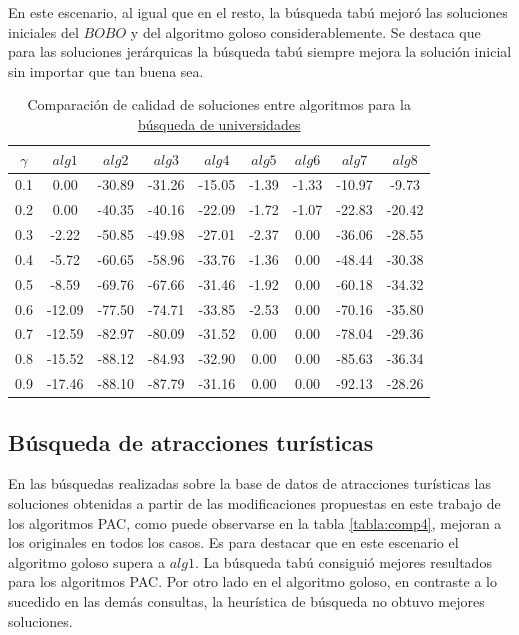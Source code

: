 En este escenario, al igual que en el resto, la búsqueda tabú mejoró las soluciones iniciales del $BOBO$ y del algoritmo goloso considerablemente. Se destaca que para las soluciones jerárquicas la búsqueda tabú siempre mejora la solución inicial sin importar que tan buena sea.
\begin{table}[H]
\begin{center}
\begin{tabular}{|c|c|c|c|c|c|c|c|c|}
\hline
$\gamma$&$alg1$&$alg2$&$alg3$&$alg4$&$alg5$&$alg6$&$alg7$&$alg8$ \\ \hline
0.1 & 0.00 & -30.89 & -31.26 & -15.05 & -1.39 & -1.33 & -10.97 & -9.73 \\
0.2 & 0.00 & -40.35 & -40.16 & -22.09 & -1.72 & -1.07 & -22.83 & -20.42 \\
0.3 & -2.22 & -50.85 & -49.98 & -27.01 & -2.37 & 0.00 & -36.06 & -28.55 \\
0.4 & -5.72 & -60.65 & -58.96 & -33.76 & -1.36 & 0.00 & -48.44 & -30.38 \\
0.5 & -8.59 & -69.76 & -67.66 & -31.46 & -1.92 & 0.00 & -60.18 & -34.32 \\
0.6 & -12.09 & -77.50 & -74.71 & -33.85 & -2.53 & 0.00 & -70.16 & -35.80 \\
0.7 & -12.59 & -82.97 & -80.09 & -31.52 & 0.00 & 0.00 & -78.04 & -29.36 \\
0.8 & -15.52 & -88.12 & -84.93 & -32.90 & 0.00 & 0.00 & -85.63 & -36.34 \\
0.9 & -17.46 & -88.10 & -87.79 & -31.16 & 0.00 & 0.00 & -92.13 & -28.26 \\
 \hline 
\end{tabular}
\caption{Comparación de calidad de soluciones entre algoritmos para la \hyperref[busqueda:universidades]{búsqueda de universidades}} 
\label{tabla:comp3}
\end{center}
\end{table}

\subsection{Búsqueda de atracciones turísticas}\label{res:busAtracciones}
En las búsquedas realizadas sobre la base de datos de atracciones turísticas las soluciones obtenidas a partir de las modificaciones propuestas en este trabajo de los algoritmos PAC, como puede observarse en la tabla \ref{tabla:comp4}, mejoran a los originales en todos los casos. Es para destacar que en este escenario el algoritmo goloso supera a $alg1$. La búsqueda tabú consiguió mejores resultados para los algoritmos PAC. Por otro lado en el algoritmo goloso, en contraste a lo sucedido en las demás consultas, la heurística de búsqueda no obtuvo mejores soluciones.

